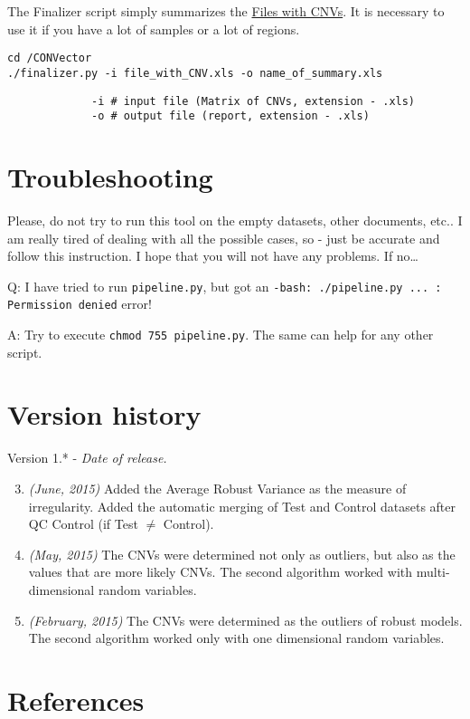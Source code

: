 \documentclass{article}
\newenvironment{benumerate}[1]{
    \let\oldItem\item
    \def\item{\addtocounter{enumi}{-2}\oldItem}
    \begin{enumerate}
    \setcounter{enumi}{#1}
    \addtocounter{enumi}{1}
}{
    \end{enumerate}
}
\begin{document}
The Finalizer script simply summarizes the \hyperlink{fileWithCNVs}{Files with CNVs}. It is necessary to use it if you have a lot of samples or a lot of regions.

\begin{lstlisting}[style=DOS, caption={Launch of Finalizer}]
cd /CONVector
./finalizer.py -i file_with_CNV.xls -o name_of_summary.xls
\end{lstlisting}


\begin{verbatim}
             -i # input file (Matrix of CNVs, extension - .xls)
             -o # output file (report, extension - .xls)
\end{verbatim}









\newpage
\section{Troubleshooting}

Please, do not try to run this tool on the empty datasets, other documents, etc.. I am really tired of dealing with all the possible cases, so - just be accurate and follow this instruction. I hope that you will not have any problems. If no\ldots

Q: I have tried to run \texttt{pipeline.py}, but got an \texttt{-bash: ./pipeline.py ... : Permission denied} error!

A: Try to execute \texttt{chmod 755 pipeline.py}. The same can help for any other script.





\newpage
\section{Version history}

Version 1.* - {\it Date of release.}
\begin{benumerate}{2}
\item {\it (June, 2015)} Added the Average Robust Variance as the measure of irregularity. Added the automatic merging of Test and Control datasets after QC Control (if Test $\neq$ Control).
\item {\it (May, 2015)} The CNVs were determined not only as outliers, but also as the values that are more likely CNVs. The second algorithm worked with multi-dimensional random variables.
\item {\it(February, 2015)} The CNVs were determined as the outliers of robust models. The second algorithm worked only with one dimensional random variables.
\end{benumerate}


\newpage
\section{References}
\end{document}
